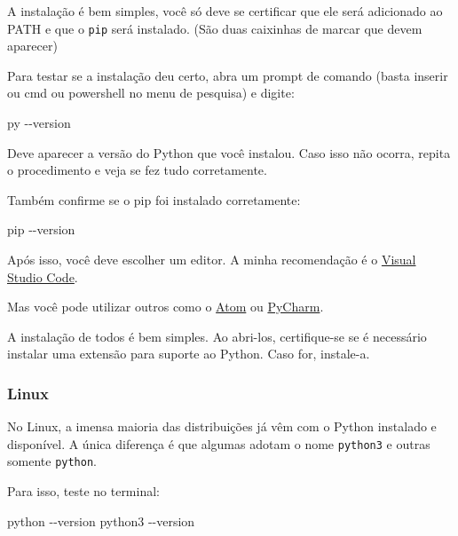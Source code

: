\documentclass[a4paper, 11pt, brazilian]{article}
\newenvironment{Shaded}{}{}
\newcommand{\ExtensionTok}[1]{{#1}}
\newcommand{\AttributeTok}[1]{\textcolor[rgb]{0.49,0.56,0.16}{{#1}}}
\begin{document}
A instalação é bem simples, você só deve se certificar que ele será
adicionado ao PATH e que o \texttt{pip} será instalado. (São duas
caixinhas de marcar que devem aparecer)

Para testar se a instalação deu certo, abra um prompt de comando (basta
inserir ou cmd ou powershell no menu de pesquisa) e digite:

\begin{Shaded}
\begin{Highlighting}[]
\ExtensionTok{py} \AttributeTok{{-}{-}version}
\end{Highlighting}
\end{Shaded}

Deve aparecer a versão do Python que você instalou. Caso isso não
ocorra, repita o procedimento e veja se fez tudo corretamente.

Também confirme se o pip foi instalado corretamente:

\begin{Shaded}
\begin{Highlighting}[]
\ExtensionTok{pip} \AttributeTok{{-}{-}version}
\end{Highlighting}
\end{Shaded}

Após isso, você deve escolher um editor. A minha recomendação é o
\href{https://code.visualstudio.com/}{Visual Studio Code}.

Mas você pode utilizar outros como o \href{https://atom.io/}{Atom} ou
\href{https://www.jetbrains.com/pt-br/pycharm/download/}{PyCharm}.

A instalação de todos é bem simples. Ao abri-los, certifique-se se é
necessário instalar uma extensão para suporte ao Python. Caso for,
instale-a.

\hypertarget{linux-1}{%
\subsubsection{Linux}\label{linux-1}}

No Linux, a imensa maioria das distribuições já vêm com o Python
instalado e disponível. A única diferença é que algumas adotam o nome
\texttt{python3} e outras somente \texttt{python}.

Para isso, teste no terminal:

\begin{Shaded}
\begin{Highlighting}[]
\ExtensionTok{python} \AttributeTok{{-}{-}version}
\ExtensionTok{python3} \AttributeTok{{-}{-}version}
\end{Highlighting}
\end{Shaded}
\end{document}
